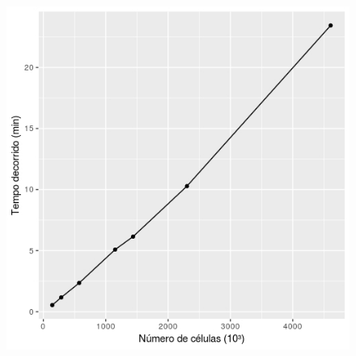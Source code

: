 \documentclass[12pt]{article}
\begin{document}
\begin{figure}[!h]
\centering \includegraphics[scale = 0.7]{../../Images/Report_29_08_18/performance.jpeg}
\end{figure}

%
%
\end{document}
